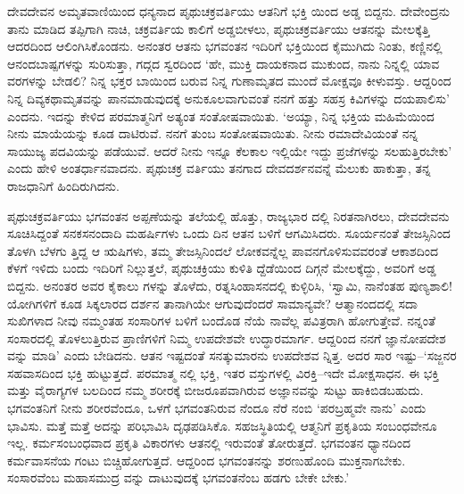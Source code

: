 ದೇವದೇವನ ಅಮೃತವಾಣಿಯಿಂದ ಧನ್ಯನಾದ ಪೃಥುಚಕ್ರವರ್ತಿಯು ಆತನಿಗೆ ಭಕ್ತಿ ಯಿಂದ ಅಡ್ಡ ಬಿದ್ದನು. ದೇವೇಂದ್ರನು ತಾನು ಮಾಡಿದ ತಪ್ಪಿಗಾಗಿ ನಾಚಿ, ಚಕ್ರವರ್ತಿಯ ಕಾಲಿಗೆ ಅಡ್ಡಬೀಳಲು, ಪೃಥುಚಕ್ರವರ್ತಿಯು ಆತನನ್ನು ಮೇಲಕ್ಕೆತ್ತಿ ಆದರದಿಂದ ಆಲಿಂಗಿಸಿಕೊಂಡನು. ಅನಂತರ ಆತನು ಭಗವಂತನ ಇದಿರಿಗೆ ಭಕ್ತಿಯಿಂದ ಕೈಮುಗಿದು ನಿಂತು, ಕಣ್ಣಿನಲ್ಲಿ ಆನಂದಬಾಷ್ಪಗಳನ್ನು ಸುರಿಸುತ್ತಾ, ಗದ್ಗದ ಸ್ವರದಿಂದ ‘ಹೇ, ಮುಕ್ತಿ ದಾಯಕನಾದ ಮುಕುಂದ, ನಾನು ನಿನ್ನಲ್ಲಿ ಯಾವ ವರಗಳನ್ನು ಬೇಡಲಿ? ನಿನ್ನ ಭಕ್ತರ ಬಾಯಿಂದ ಬರುವ ನಿನ್ನ ಗುಣಾಮೃತದ ಮುಂದೆ ಮೋಕ್ಷವೂ ಕೀಳುವಸ್ತು. ಆದ್ದರಿಂದ ನಿನ್ನ ದಿವ್ಯಕಥಾಮೃತವನ್ನು ಪಾನಮಾಡುವುದಕ್ಕೆ ಅನುಕೂಲವಾಗುವಂತೆ ನನಗೆ ಹತ್ತು ಸಹಸ್ರ ಕಿವಿಗಳನ್ನು ದಯಪಾಲಿಸು’ ಎಂದನು. ಇದನ್ನು ಕೇಳಿದ ಪರಮಾತ್ಮನಿಗೆ ಅತ್ಯಂತ ಸಂತೋಷವಾಯಿತು. ‘ಅಯ್ಯಾ, ನಿನ್ನ ಭಕ್ತಿಯ ಮಹಿಮೆಯಿಂದ ನೀನು ಮಾಯೆಯನ್ನು ಕೂಡ ದಾಟಿರುವೆ. ನನಗೆ ತುಂಬ ಸಂತೋಷವಾಯಿತು. ನೀನು ರಮಾದೇವಿಯಂತೆ ನನ್ನ ಸಾಯುಜ್ಯ ಪದವಿಯನ್ನು ಪಡೆಯುವೆ. ಆದರೆ ನೀನು ಇನ್ನೂ ಕೆಲಕಾಲ ಇಲ್ಲಿಯೇ ಇದ್ದು ಪ್ರಜೆಗಳನ್ನು ಸಲಹುತ್ತಿರಬೇಕು’ ಎಂದು ಹೇಳಿ ಅಂತರ್ಧಾನವಾದನು. ಪೃಥುಚಕ್ರ ವರ್ತಿಯು ತನಗಾದ ದೇವದರ್ಶನವನ್ನೆ ಮೆಲುಕು ಹಾಕುತ್ತಾ, ತನ್ನ ರಾಜಧಾನಿಗೆ ಹಿಂದಿರುಗಿದನು.

ಪೃಥುಚಕ್ರವರ್ತಿಯು ಭಗವಂತನ ಅಪ್ಪಣೆಯನ್ನು ತಲೆಯಲ್ಲಿ ಹೊತ್ತು, ರಾಜ್ಯಭಾರ ದಲ್ಲಿ ನಿರತನಾಗಿರಲು, ದೇವದೇವನು ಸೂಚಿಸಿದ್ದಂತೆ ಸನಕಸನಂದಾದಿ ಮಹರ್ಷಿಗಳು ಒಂದು ದಿನ ಆತನ ಬಳಿಗೆ ಆಗಮಿಸಿದರು. ಸೂರ್ಯನಂತೆ ತೇಜಸ್ಸಿನಿಂದ ತೊಳಗಿ ಬೆಳಗು ತ್ತಿದ್ದ ಆ ಋಷಿಗಳು, ತಮ್ಮ ತೇಜಸ್ಸಿನಿಂದಲೆ ಲೋಕವನ್ನೆಲ್ಲ ಪಾವನಗೊಳಿಸುವವರಂತೆ ಆಕಾಶದಿಂದ ಕೆಳಗೆ ಇಳಿದು ಬಂದು ಇದಿರಿಗೆ ನಿಲ್ಲುತ್ತಲೆ, ಪೃಥುಚಕ್ರಿಯು ಕುಳಿತಿ ದ್ದೆಡೆಯಿಂದ ದಿಗ್ಗನೆ ಮೇಲಕ್ಕೆದ್ದು, ಅವರಿಗೆ ಅಡ್ಡ ಬಿದ್ದನು. ಅನಂತರ ಅವರ ಕೈಕಾಲು ಗಳನ್ನು ತೊಳೆದು, ರತ್ನಸಿಂಹಾಸನದಲ್ಲಿ ಕುಳ್ಳಿರಿಸಿ, ‘ಸ್ವಾಮಿ, ನಾನೆಂತಹ ಪುಣ್ಯಶಾಲಿ! ಯೋಗಿಗಳಿಗೆ ಕೂಡ ಸಿಕ್ಕಲಾರದ ದರ್ಶನ ತಾನಾಗಿಯೇ ಆಗುವುದೆಂದರೆ ಸಾಮಾನ್ಯವೇ? ಆತ್ಮಾನಂದದಲ್ಲಿ ಸದಾ ಸುಖಿಗಳಾದ ನೀವು ನಮ್ಮಂತಹ ಸಂಸಾರಿಗಳ ಬಳಿಗೆ ಬಂದೊಡ ನೆಯೆ ನಾವೆಲ್ಲ ಪವಿತ್ರರಾಗಿ ಹೋಗುತ್ತೇವೆ. ನನ್ನಂತೆ ಸಂಸಾರದಲ್ಲಿ ತೊಳಲುತ್ತಿರುವ ಪ್ರಾಣಿಗಳಿಗೆ ನಿಮ್ಮ ಉಪದೇಶವೇ ಉದ್ಧಾರಮಾರ್ಗ. ಆದ್ದರಿಂದ ನನಗೆ ಜ್ಞಾನೋಪದೇಶ ವನ್ನು ಮಾಡಿ’ ಎಂದು ಬೇಡಿದನು. ಆತನ ಇಷ್ಟದಂತೆ ಸನತ್ಕುಮಾರನು ಉಪದೇಶವ ನ್ನಿತ್ತ. ಅದರ ಸಾರ ಇಷ್ಟು–‘ಸಜ್ಜನರ ಸಹವಾಸದಿಂದ ಭಕ್ತಿ ಹುಟ್ಟುತ್ತದೆ. ಪರಮಾತ್ಮ ನಲ್ಲಿ ಭಕ್ತಿ, ಇತರ ವಸ್ತುಗಳಲ್ಲಿ ವಿರಕ್ತಿ–ಇದೇ ಮೋಕ್ಷಸಾಧನ. ಈ ಭಕ್ತಿ ಮತ್ತು ವೈರಾಗ್ಯಗಳ ಬಲದಿಂದ ನಮ್ಮ ಶರೀರಕ್ಕೆ ಬೀಜರೂಪವಾಗಿರುವ ಅಜ್ಞಾನವನ್ನು ಸುಟ್ಟು ಹಾಕಿಬಿಡಬಹುದು. ಭಗವಂತನಿಗೆ ನೀನು ಶರೀರವೆಂದೂ, ಒಳಗೆ ಭಗವಂತನಿರುವ ನೆಂದೂ ನೆರೆ ನಂಬಿ ‘ಪರಬ್ರಹ್ಮವೇ ನಾನು’ ಎಂದು ಭಾವಿಸು. ಮತ್ತೆ ಮತ್ತೆ ಅದನ್ನು ಪರಿಭಾವಿಸಿ ದೃಢಪಡಿಸಿಕೊ. ಸಹಜಸ್ಥಿತಿಯಲ್ಲಿ ಆತ್ಮನಿಗೆ ಪ್ರಕೃತಿಯ ಸಂಬಂಧವೇನೂ ಇಲ್ಲ. ಕರ್ಮಸಂಬಂಧವಾದ ಪ್ರಕೃತಿ ವಿಕಾರಗಳು ಆತನಲ್ಲಿ ಇರುವಂತೆ ತೋರುತ್ತದೆ. ಭಗವಂತನ ಧ್ಯಾನದಿಂದ ಕರ್ಮವಾಸನೆಯ ಗಂಟು ಬಿಚ್ಚಿಹೋಗುತ್ತದೆ. ಆದ್ದರಿಂದ ಭಗವಂತನನ್ನು ಶರಣುಹೊಂದಿ ಮುಕ್ತನಾಗಬೇಕು. ಸಂಸಾರವೆಂಬ ಮಹಾಸಮುದ್ರ ವನ್ನು ದಾಟುವುದಕ್ಕೆ ಭಗವಂತನೆಂಬ ಹಡಗು ಬೇಕೇ ಬೇಕು.’

